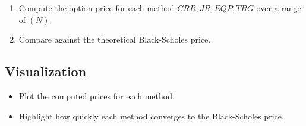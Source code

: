 \documentclass[11pt]{article}
\begin{document}
\begin{enumerate}
\item
  Compute the option price for each method \(CRR, JR, EQP, TRG\)
  over a range of \((N)\).
\item
  Compare against the theoretical Black-Scholes price.
\end{enumerate}

\subsection{Visualization}\label{visualization}

\begin{itemize}
\item
  Plot the computed prices for each method.
\item
  Highlight how quickly each method converges to the Black-Scholes
  price.
\end{itemize}
\end{document}
